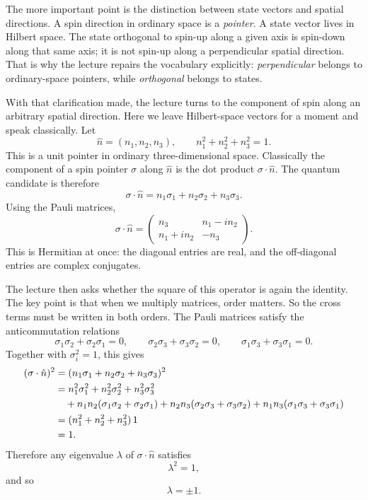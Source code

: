 The more important point is the distinction between state vectors and spatial directions. A spin direction in ordinary space is a \emph{pointer}. A state vector lives in Hilbert space. The state orthogonal to spin-up along a given axis is spin-down along that same axis; it is not spin-up along a perpendicular spatial direction. That is why the lecture repairs the vocabulary explicitly: \emph{perpendicular} belongs to ordinary-space pointers, while \emph{orthogonal} belongs to states.

With that clarification made, the lecture turns to the component of spin along an arbitrary spatial direction. Here we leave Hilbert-space vectors for a moment and speak classically. Let
\begin{equation}
\hat n=(n_1,n_2,n_3),
\qquad
n_1^2+n_2^2+n_3^2=1.
\end{equation}
This is a unit pointer in ordinary three-dimensional space. Classically the component of a spin pointer \(\sigma\) along \(\hat n\) is the dot product \(\sigma\cdot\hat n\). The quantum candidate is therefore
\begin{equation}
\sigma\cdot\hat n=n_1\sigma_1+n_2\sigma_2+n_3\sigma_3.
\end{equation}
Using the Pauli matrices,
\begin{equation}
\sigma\cdot\hat n=
\begin{pmatrix}
n_3 & n_1-in_2\\
n_1+in_2 & -n_3
\end{pmatrix}.
\end{equation}
This is Hermitian at once: the diagonal entries are real, and the off-diagonal entries are complex conjugates.

The lecture then asks whether the square of this operator is again the identity. The key point is that when we multiply matrices, order matters. So the cross terms must be written in both orders. The Pauli matrices satisfy the anticommutation relations
\begin{equation}
\sigma_1\sigma_2+\sigma_2\sigma_1=0,
\qquad
\sigma_2\sigma_3+\sigma_3\sigma_2=0,
\qquad
\sigma_1\sigma_3+\sigma_3\sigma_1=0.
\end{equation}
Together with \(\sigma_i^2=1\), this gives
\begin{align}
(\sigma\cdot\hat n)^2
&=
(n_1\sigma_1+n_2\sigma_2+n_3\sigma_3)^2\\
&=
n_1^2\sigma_1^2+n_2^2\sigma_2^2+n_3^2\sigma_3^2 \notag\\
&\quad
+n_1n_2(\sigma_1\sigma_2+\sigma_2\sigma_1)
+n_2n_3(\sigma_2\sigma_3+\sigma_3\sigma_2)
+n_1n_3(\sigma_1\sigma_3+\sigma_3\sigma_1) \notag\\
&=
(n_1^2+n_2^2+n_3^2)\,1\\
&=1. \notag
\end{align}
Therefore any eigenvalue \(\lambda\) of \(\sigma\cdot\hat n\) satisfies
\begin{equation}
\lambda^2=1,
\end{equation}
and so
\begin{equation}
\lambda=\pm1.
\end{equation}

